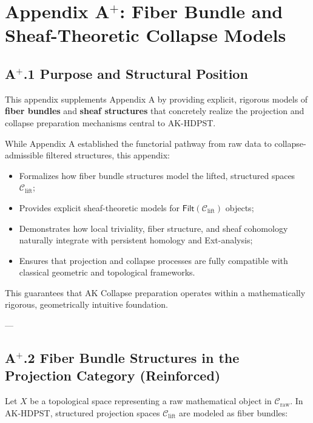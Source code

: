 \documentclass[11pt]{article}
\begin{document}
\section*{Appendix A$^{+}$: Fiber Bundle and Sheaf-Theoretic Collapse Models}

\subsection*{A$^{+}$.1 Purpose and Structural Position}

This appendix supplements Appendix A by providing explicit, rigorous models of \textbf{fiber bundles} and \textbf{sheaf structures} that concretely realize the projection and collapse preparation mechanisms central to AK-HDPST.

While Appendix A established the functorial pathway from raw data to collapse-admissible filtered structures, this appendix:

\begin{itemize}
    \item Formalizes how fiber bundle structures model the lifted, structured spaces $\mathcal{C}_{\mathrm{lift}}$;
    \item Provides explicit sheaf-theoretic models for $\mathsf{Filt}(\mathcal{C}_{\mathrm{lift}})$ objects;
    \item Demonstrates how local triviality, fiber structure, and sheaf cohomology naturally integrate with persistent homology and Ext-analysis;
    \item Ensures that projection and collapse processes are fully compatible with classical geometric and topological frameworks.
\end{itemize}

This guarantees that AK Collapse preparation operates within a mathematically rigorous, geometrically intuitive foundation.

---

\subsection*{A$^{+}$.2 Fiber Bundle Structures in the Projection Category (Reinforced)}

Let \( X \) be a topological space representing a raw mathematical object in \( \mathcal{C}_{\mathrm{raw}} \). In AK-HDPST, structured projection spaces \( \mathcal{C}_{\mathrm{lift}} \) are modeled as fiber bundles:
\end{document}
